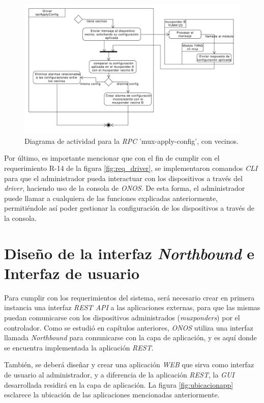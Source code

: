   \begin{figure}[H]
    \centering
    \includegraphics[scale=0.44]{Figures/actividad_driver_rpc_con_vecinos.pdf}
    \caption{Diagrama de actividad para la \textit{RPC} 'mux-apply-config', con vecinos.}
    \label{fig:actividad_driver_rpc_con_vecinos}
  \end{figure}


  Por último, es importante mencionar que con el fin de cumplir con el requerimiento R-14 de la figura \ref{fig:req_driver}, se implementaron comandos \textit{CLI} para que el administrador pueda interactuar con los dispositivos a través del \textit{driver}, haciendo uso de la consola de \textit{ONOS}. De esta forma, el administrador puede llamar a cualquiera de las funciones explicadas anteriormente, permitiéndole así poder gestionar la configuración de los dispositivos a través de la consola.

  \section{Diseño de la interfaz \textit{Northbound} e Interfaz de usuario}
  Para cumplir con los requerimientos del sistema, será necesario crear en primera instancia una interfaz \textit{REST API} a las aplicaciones externas, para que las mismas puedan comunicarse con los dispositivos administrados (\textit{muxponders}) por el controlador. Como se estudió en capítulos anteriores, \textit{ONOS} utiliza una interfaz llamada \textit{Northbound} para comunicarse con la capa de aplicación, y es aquí donde se encuentra implementada la aplicación \textit{REST}. 

  También, se deberá diseñar y crear una aplicación \textit{WEB} que sirva como interfaz de usuario al administrador, y a diferencia de la aplicación \textit{REST}, la \textit{GUI} desarrollada residirá en la capa de aplicación. La figura \ref{fig:ubicacionapp} esclarece la ubicación de las aplicaciones mencionadas anteriormente. 

